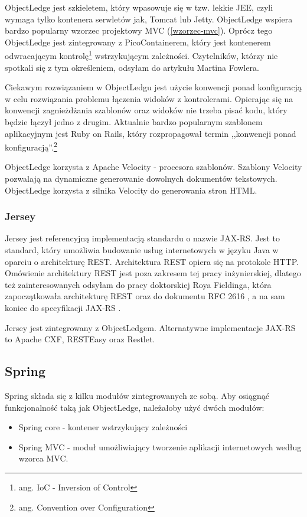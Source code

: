 \documentclass[a4paper,onecolumn,oneside,11pt,wide,floatssmall]{mwrep}
\theoremstyle{definition}
\theoremstyle{plain}%
\theoremstyle{remark}
\begin{document}
ObjectLedge jest szkieletem, który wpasowuje się w tzw. lekkie JEE, czyli wymaga tylko kontenera serwletów jak, Tomcat lub Jetty. ObjectLedge wspiera bardzo popularny wzorzec projektowy MVC (\ref{wzorzec-mvc}). Oprócz tego ObjectLedge jest zintegrowany z PicoContainerem, który jest kontenerem odwracającym kontrolę\footnote{ang. IoC - Inversion of Control} wstrzykującym zależności. Czytelników, którzy nie spotkali się z tym określeniem, odsyłam do artykułu Martina Fowlera. \cite{fowlerDIIOC} 

Ciekawym rozwiązaniem w ObjectLedgu jest użycie konwencji ponad konfiguracją w celu rozwiązania problemu łączenia widoków z kontrolerami. Opierając się na konwencji zagnieżdżania szablonów oraz widoków nie trzeba pisać kodu, który będzie łączył jedno z drugim. Aktualnie bardzo popularnym szablonem aplikacyjnym jest Ruby on Rails\cite{rubyOnRailsHome}, który rozpropagował termin ,,konwencji ponad konfiguracją''.\footnote{ang. Convention over Configuration}

ObjectLedge korzysta z Apache Velocity \cite{velocityHome} - procesora szablonów. Szablony Velocity pozwalają na dynamiczne generowanie dowolnych dokumentów tekstowych. ObjectLedge korzysta z silnika Velocity do generowania stron HTML.

\subsubsection{Jersey}
\label{jersey}
Jersey jest referencyjną implementacją standardu o nazwie JAX-RS. Jest to standard, który umożliwia budowanie usług internetowych w języku Java w oparciu o architekturę REST. Architektura REST opiera się na protokole HTTP. Omówienie architektury REST jest poza zakresem tej pracy inżynierskiej, dlatego też zainteresowanych odsyłam do pracy doktorskiej Roya Fieldinga, która zapoczątkowała architekturę REST \cite{Fielding2000} oraz do dokumentu RFC 2616 \cite{http-rfc}, a na sam koniec do specyfikacji JAX-RS \cite{jax-rs}.

Jersey jest zintegrowany z ObjectLedgem. Alternatywne implementacje JAX-RS to Apache CXF, RESTEasy oraz Restlet.

\subsection{Spring}
Spring \cite{springHome} składa się z kilku modułów zintegrowanych ze sobą. Aby osiągnąć funkcjonalność taką jak ObjectLedge, należałoby użyć dwóch modułów:
\begin{itemize}
  \item Spring core - kontener wstrzykujący zależności
  \item Spring MVC - moduł umożliwiający tworzenie aplikacji internetowych według wzorca MVC.
\end{itemize}
\end{document}
